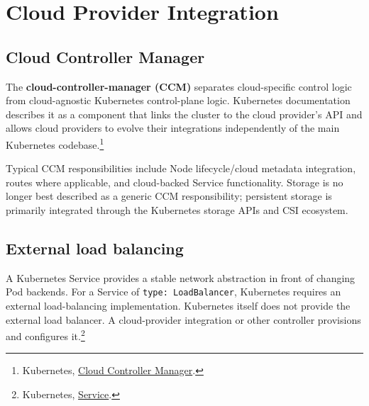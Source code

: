 \documentclass[11pt]{article}
\newcommand{\term}[1]{\textbf{\textcolor{KubeBlue}{#1}}}
\newcommand{\code}[1]{\texttt{#1}}
\newcommand{\src}[2]{\href{#2}{#1}}
\begin{document}
\section{Cloud Provider Integration}

\subsection{Cloud Controller Manager}
The \term{cloud-controller-manager (CCM)} separates cloud-specific control logic from cloud-agnostic Kubernetes control-plane logic. Kubernetes documentation describes it as a component that links the cluster to the cloud provider's API and allows cloud providers to evolve their integrations independently of the main Kubernetes codebase.\footnote{Kubernetes, \src{Cloud Controller Manager}{https://kubernetes.io/docs/concepts/architecture/cloud-controller/}.}

Typical CCM responsibilities include Node lifecycle/cloud metadata integration, routes where applicable, and cloud-backed Service functionality. Storage is no longer best described as a generic CCM responsibility; persistent storage is primarily integrated through the Kubernetes storage APIs and CSI ecosystem.

\subsection{External load balancing}
A Kubernetes Service provides a stable network abstraction in front of changing Pod backends. For a Service of \code{type: LoadBalancer}, Kubernetes requires an external load-balancing implementation. Kubernetes itself does not provide the external load balancer. A cloud-provider integration or other controller provisions and configures it.\footnote{Kubernetes, \src{Service}{https://kubernetes.io/docs/concepts/services-networking/service/}.}

\begin{center}
\end{center}
\end{document}
